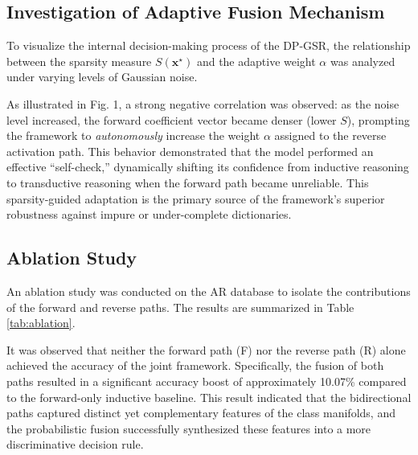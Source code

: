 \documentclass[10pt,comsoc]{IEEEtran}
\begin{document}
\subsection{Investigation of Adaptive Fusion Mechanism}
To visualize the internal decision-making process of the DP-GSR, the relationship between the sparsity measure $S(\mathbf{x}^\star)$ and the adaptive weight $\alpha$ was analyzed under varying levels of Gaussian noise. 

As illustrated in Fig. 1, a strong negative correlation was observed: as the noise level increased, the forward coefficient vector became denser (lower $S$), prompting the framework to \textit{autonomously} increase the weight $\alpha$ assigned to the reverse activation path. This behavior demonstrated that the model performed an effective ``self-check,'' dynamically shifting its confidence from inductive reasoning to transductive reasoning when the forward path became unreliable. This sparsity-guided adaptation is the primary source of the framework's superior robustness against impure or under-complete dictionaries.


\subsection{Ablation Study}
An ablation study was conducted on the AR database to isolate the contributions of the forward and reverse paths. The results are summarized in Table \ref{tab:ablation}. 

It was observed that neither the forward path (F) nor the reverse path (R) alone achieved the accuracy of the joint framework. Specifically, the fusion of both paths resulted in a significant accuracy boost of approximately 10.07\% compared to the forward-only inductive baseline. This result indicated that the bidirectional paths captured distinct yet complementary features of the class manifolds, and the probabilistic fusion successfully synthesized these features into a more discriminative decision rule.
\end{document}
